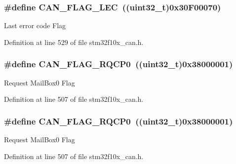 \subsubsection[{\texorpdfstring{C\+A\+N\+\_\+\+F\+L\+A\+G\+\_\+\+L\+EC}{CAN_FLAG_LEC}}]{\setlength{\rightskip}{0pt plus 5cm}\#define C\+A\+N\+\_\+\+F\+L\+A\+G\+\_\+\+L\+EC~(({\bf uint32\+\_\+t})0x30\+F00070)}\hypertarget{group___c_a_n__flags_ga73a774fa4d391aec0ea6552bf9372917}{}\label{group___c_a_n__flags_ga73a774fa4d391aec0ea6552bf9372917}
Last error code Flag 

Definition at line 529 of file stm32f10x\+\_\+can.\+h.

\subsubsection[{\texorpdfstring{C\+A\+N\+\_\+\+F\+L\+A\+G\+\_\+\+R\+Q\+C\+P0}{CAN_FLAG_RQCP0}}]{\setlength{\rightskip}{0pt plus 5cm}\#define C\+A\+N\+\_\+\+F\+L\+A\+G\+\_\+\+R\+Q\+C\+P0~(({\bf uint32\+\_\+t})0x38000001)}\hypertarget{group___c_a_n__flags_ga6df0579049eb471720ea103c5446298b}{}\label{group___c_a_n__flags_ga6df0579049eb471720ea103c5446298b}
Request Mail\+Box0 Flag 

Definition at line 507 of file stm32f10x\+\_\+can.\+h.

\subsubsection[{\texorpdfstring{C\+A\+N\+\_\+\+F\+L\+A\+G\+\_\+\+R\+Q\+C\+P0}{CAN_FLAG_RQCP0}}]{\setlength{\rightskip}{0pt plus 5cm}\#define C\+A\+N\+\_\+\+F\+L\+A\+G\+\_\+\+R\+Q\+C\+P0~(({\bf uint32\+\_\+t})0x38000001)}\hypertarget{group___c_a_n__flags_ga6df0579049eb471720ea103c5446298b}{}\label{group___c_a_n__flags_ga6df0579049eb471720ea103c5446298b}
Request Mail\+Box0 Flag 

Definition at line 507 of file stm32f10x\+\_\+can.\+h.

